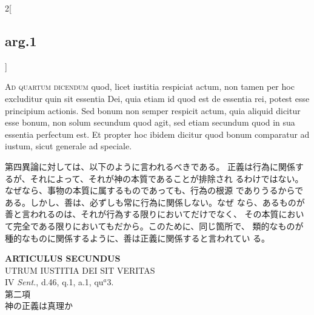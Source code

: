 \documentclass[paper=a4paper,fontsize=10pt,jafontsize=9pt,titlepage]{jlreq}
\begin{document}
\begin{paracol}{2}[\subsection{arg.1}]
\switchcolumn*[\subsection{ad.4}]

{\scshape Ad quartum dicendum} quod, licet iustitia
respiciat actum, non tamen per hoc excluditur quin sit essentia Dei,
quia etiam id quod est de essentia rei, potest esse principium
actionis. Sed bonum non semper respicit actum, quia aliquid dicitur esse
bonum, non solum secundum quod agit, sed etiam secundum quod in sua
essentia perfectum est. Et propter hoc ibidem dicitur quod bonum
comparatur ad iustum, sicut generale ad speciale.

\switchcolumn

第四異論に対しては、以下のように言われるべきである。
正義は行為に関係するが、それによって、それが神の本質であることが排除され
 るわけではない。なぜなら、事物の本質に属するものであっても、行為の根源
 でありうるからである。しかし、善は、必ずしも常に行為に関係しない。なぜ
 なら、あるものが善と言われるのは、それが行為する限りにおいてだけでなく、
 その本質において完全である限りにおいてもだから。このために、同じ箇所で、
 類的なものが種的なものに関係するように、善は正義に関係すると言われてい
 る。

\end{paracol}
\newpage
{}
{}
\setcounter{section}{2}
\setcounter{subsection}{0}








\begin{center}
 {\Large {\bfseries ARTICULUS SECUNDUS}}\\
 {\large UTRUM IUSTITIA DEI SIT VERITAS}\\
 {\footnotesize IV {\itshape Sent.}, d.46, q.1, a.1, qu$^a$3.}\\
 {\Large 第二項\\神の正義は真理か}
\end{center}
\end{document}
